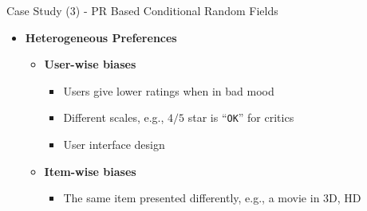\documentclass[
 size=14pt,
 paper=smartboard,  %
 mode=present, 		%
 display=slides, 	%
 style=tuliplab,  	%
 pauseslide,
 fleqn,leqno]{powerdot}{}
\begin{document}
\begin{slide}[toc=,bm=]{Case Study (3) - PR Based Conditional Random Fields}
	
	
	\begin{itemize}
		\item  \textbf{Heterogeneous Preferences}
		
		\begin{itemize}
			\item \textbf{User-wise biases}
			\begin{itemize}
				\item Users give lower ratings when in bad mood
				
				\item Different scales, e.g., $4/5$ star is ``\texttt{OK}'' for critics
				
				\item User interface design
				
			\end{itemize}
			
			\item \textbf{Item-wise biases}
			
			\begin{itemize}
				
				\item The same item presented differently,
				e.g., a movie in 3D, HD
				
			\end{itemize}
		\end{itemize}
	\end{itemize}

	
	
\end{slide}
\end{document}
